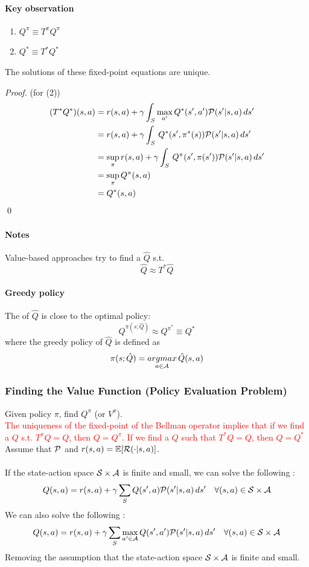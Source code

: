 \documentclass[11pt]{article}
\begin{document}
\paragraph{Key observation}
\begin{enumerate}
	\item $ Q^\pi \equiv T^\pi Q^\pi$ 
	\item $Q^* \equiv T^*Q^*$
\end{enumerate}
The solutions of these fixed-point equations are unique.
\begin{proof} (for (2))
\begin{align}
	(T^* Q^*)(s,a) &= r(s,a) + \gamma \int_S\underset{a'}{\max}\,Q^*(s', a')\mathcal{P}(s'|s,a)\,ds' \\
	&= r(s,a) + \gamma \int_S\,Q^*(s', \pi^*(s))\mathcal{P}(s'|s,a)\,ds' \\
	&= \underset{\pi}{\sup} \, r(s,a) + \gamma \int_S\,Q^\pi(s', \pi(s'))\mathcal{P}(s'|s,a)\,ds' \\
	&= \underset{\pi}{\sup} \, Q^\pi (s,a) \\
	&= Q^*(s,a)
\end{align} \qed
\end{proof}
\paragraph{Notes}
Value-based approaches try to find a $\hat{Q}$ s.t.
$$\hat{Q} \approx T^*\hat{Q}$$
\paragraph{Greedy policy}
The  of $\hat{Q}$ is close to the optimal policy:
$$Q^{\pi(s;\hat{Q})} \approx Q^{\pi^*} \equiv Q^*$$
where the greedy policy of $\hat{Q}$ is defined as 
$$\pi(s;\hat{Q}) = \underset{a \in \mathcal{A}}{argmax}\, \hat{Q}(s,a)$$

\subsubsection{Finding the Value Function (Policy Evaluation Problem)}
Given policy $\pi$, find $Q^\pi$ (or $V^\pi$). \\
\textcolor{red}{The uniqueness of the fixed-point of the Bellman operator implies that if we find a $Q$ s.t. $T^\pi Q = Q$, then $Q = Q^\pi$. If we find a $Q$ such that $T^*Q = Q$, then $Q = Q^*$} \\
Assume that $\mathcal{P}$ and $r(s,a) = \mathbb{E}[\mathcal{R}(\cdot|s,a)]$. \\
 \\
If the state-action space $\mathcal{S} \times \mathcal{A}$ is finite and small, we can solve the following :
$$Q(s, a) = r(s,a) + \gamma \sum_S Q(s', a)\mathcal{P}(s'|s,a)\,ds' \quad \forall(s,a) \in \mathcal{S} \times \mathcal{A}$$
We can also solve the following :
$$Q(s, a) = r(s,a) + \gamma \sum_S \underset{a' \in \mathcal{A}}{\max}\,Q(s', a')\mathcal{P}(s'|s,a)\,ds' \quad \forall(s,a) \in \mathcal{S} \times \mathcal{A}$$
 Removing the assumption that the state-action space $\mathcal{S} \times \mathcal{A}$ is finite and small.
\end{document}
